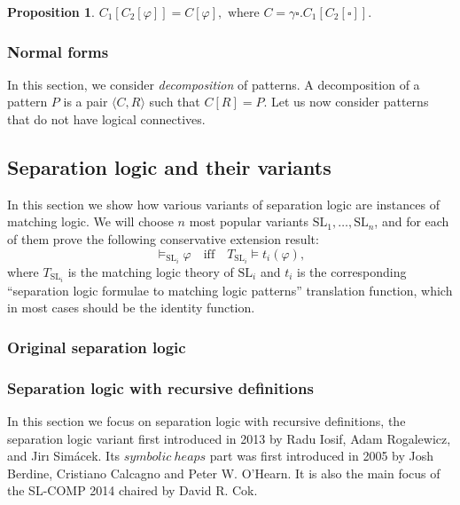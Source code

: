 \documentclass{article}
\theoremstyle{plain}
\newtheorem{prop}[thm]{Proposition}
\begin{document}
\begin{prop}
	$C_1[C_2[\varphi]] = C [\varphi], \text{ where } C = \gamma \square . C_1[C_2[\square]].$
\end{prop}

\subsubsection{Normal forms}

In this section, we consider \emph{decomposition} of patterns. A decomposition of a pattern $P$ is a pair $\langle C, R \rangle $ such that $C[R] = P$. Let us now consider patterns that do not have logical connectives.

\subsection{Separation logic and their variants}

In this section we show how various variants of separation logic are instances of matching logic. We will choose $n$ most popular variants $\mathrm{SL}_1, \dots, \mathrm{SL}_n$, and for each of them prove the following conservative extension result:
\begin{equation*}
\vDash_{\mathrm{SL}_i} \varphi \quad \text{iff} \quad T_{\mathrm{SL}_i} \vDash t_i(\varphi),
\end{equation*}
where $T_{\mathrm{SL}_i}$ is the matching logic theory of $\mathrm{SL}_i$ and $t_i$ is the corresponding ``separation logic formulae to matching logic patterns''  translation function, which in most cases should be the identity function.

\subsubsection{Original separation logic}

\subsubsection{Separation logic with recursive definitions}

In this section we focus on separation logic with  recursive definitions, the separation logic variant first introduced in 2013 by Radu Iosif, Adam Rogalewicz, and Jirı Simácek. Its $symbolic\ heaps$ part was first introduced in 2005 by Josh Berdine, Cristiano Calcagno and Peter W. O'Hearn. It is also the main focus of the SL-COMP 2014 chaired by David R. Cok.
\end{document}

